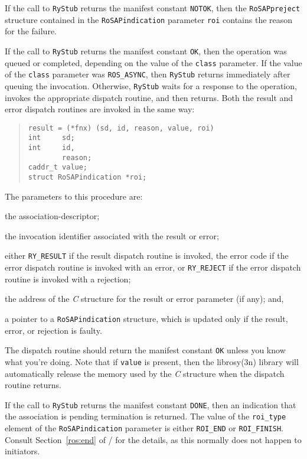 If the call to \verb"RyStub" returns the manifest constant \verb"NOTOK",
then the \verb"RoSAPpreject" structure contained in
the \verb"RoSAPindication" parameter
\verb"roi" contains the reason for the failure.

If the call to \verb"RyStub" returns the manifest constant \verb"OK",
then the operation was queued or completed,
depending on the value of the \verb"class" parameter.
If the value of the \verb"class" parameter was \verb"ROS_ASYNC",
then \verb"RyStub" returns immediately after queuing the invocation.
Otherwise,
\verb"RyStub" waits for a response to the operation,
invokes the appropriate dispatch routine,
and then returns.
Both the result and error dispatch routines are invoked in the same way:
\begin{quote}\small\begin{verbatim}
result = (*fnx) (sd, id, reason, value, roi)
int     sd;
int     id,
        reason;
caddr_t value;
struct RoSAPindication *roi;
\end{verbatim}\end{quote}
The parameters to this procedure are:
\begin{describe}
\item[\verb"sd":] the association-descriptor;

\item[\verb"id":] the invocation identifier associated with the result or
error;

\item[\verb"reason":] either \verb"RY_RESULT" if the result dispatch routine
is invoked, the error code if the error dispatch routine is invoked with an
error, or \verb"RY_REJECT" if the error dispatch routine is invoked with a
rejection;

\item[\verb"value":] the address of the {\em C\/} structure for the result or
error parameter (if any);
and,

\item[\verb"roi":] a pointer to a \verb"RoSAPindication" structure,
which is updated only if the result, error, or rejection is faulty.
\end{describe}
The dispatch routine should return the manifest constant \verb"OK"
unless you know what you're doing.
Note that if \verb"value" is present,
then the \man librosy(3n) library will automatically release the memory used
by the {\em C\/} structure when the dispatch routine returns.

If the call to \verb"RyStub" returns the manifest constant \verb"DONE",
then an indication that the association is pending termination is returned.
The value of the \verb"roi_type" element of the \verb"RoSAPindication"
parameter is either \verb"ROI_END" or \verb"ROI_FINISH".
Consult Section~\ref{ros:end} of \volone/ for the details,
as this normally does not happen to initiators.

